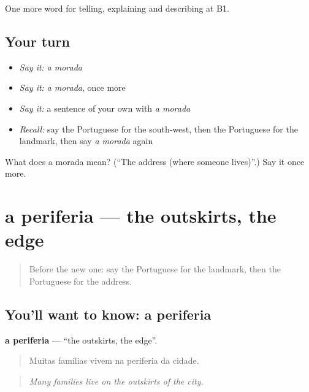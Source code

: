 \begin{grammarlens}[title={What you've built}]
One more word for telling, explaining and describing at B1.
\end{grammarlens}

\subsection*{Your turn}
\begin{itemize}
\raggedright
  \item \emph{Say it:} \emph{a morada}
  \item \emph{Say it:} \emph{a morada}, once more
  \item \emph{Say it:} a sentence of your own with \emph{a morada}
  \item \emph{Recall:} say the Portuguese for the south-west, then the Portuguese for the landmark, then say \emph{a morada} again
\end{itemize}

\begin{tcolorbox}[breakable,colback=teal!4,colframe=teal!35!black,title={Before you move on}]
What does a morada mean? (\textquotedblleft{}The address (where someone lives)\textquotedblright{}.) Say it once more.
\end{tcolorbox}
\section[a periferia]{a periferia — the outskirts, the edge}

\label{lesson:PT-C440-periferia}



\begin{quote}
Before the new one: say the Portuguese for the landmark, then the Portuguese for the address.
\end{quote}

\subsection*{You'll want to know: a periferia}
\textbf{a periferia} — \textquotedblleft{}the outskirts, the edge\textquotedblright{}.

\begin{quote}
Muitas famílias vivem na periferia da cidade.
\end{quote}

\begin{quote}
\emph{Many families live on the outskirts of the city.}
\end{quote}

